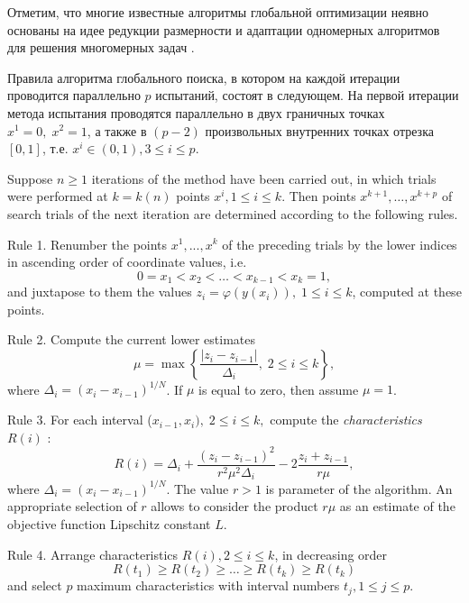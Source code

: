 \documentclass{svproc}
\begin{document}
Отметим, что многие известные алгоритмы глобальной оптимизации неявно основаны на идее редукции размерности и адаптации одномерных алгоритмов для решения многомерных задач \cite{Sergeyev2006,Zilinskas2008,Evtushenko2013}.


Правила алгоритма глобального поиска, в котором на каждой итерации проводится параллельно $p$ испытаний, состоят в следующем.
На первой итерации метода испытания проводятся параллельно в двух граничных точках $x^1 = 0, \; x^2 = 1$, а также в $(p-2)$ произвольных внутренних точках отрезка $[0,1]$, т.е. $x^i\in(0,1),3\leq i \leq p$.

Suppose $n\geq 1$  iterations of the method have been carried out, in which trials were performed at $k=k(n)$ points $x^i,1\leq i \leq k$. Then points $x^{k+1},\dots,x^{k+p}$  of search trials of the next iteration are determined according to the following rules.

Rule 1. Renumber the points $x^1,...,x^k$ of the preceding trials by the
lower indices in ascending order of coordinate values, i.e.
\[
0=x_1<x_2<\dots <x_{k-1} <x_k=1,
\]
and juxtapose to them the values $z_i=\varphi(y(x_i)), \; 1 \leq i \leq k$, computed at these points.

Rule 2. Compute the current lower estimates
\begin{equation}\label{Rule_Mu}
\mu = \max\left\{ \frac{\left|z_i-z_{i-1}\right|}{ \Delta_i },\; 2 \leq i \leq k  \right\},
\end{equation}
where $\Delta_i = (x_i-x_{i-1})^{1/N}$. If $\mu$ is equal to zero, then assume $\mu = 1$.

Rule 3. For each interval ($x_{i-1},x_i), \; 2 \leq i \leq k,$ compute
the \textit{characteristics} $R(i)$ :
\begin{equation}\label{Rule_R}
R(i)=\Delta_i+\frac{(z_i-z_{i-1})^2}{r^2 \mu^2\Delta_i}-2\frac{z_i+z_{i-1}}{r \mu},
\end{equation}
where $\Delta_i=(x_i-x_{i-1})^{1/N}$. The value $r > 1$ is parameter of the algorithm. An appropriate selection
of $r$ allows to consider the product $r \mu$ as an estimate
of the objective function Lipschitz constant $L$.

Rule 4. Arrange characteristics  $R(i), 2 \leq i \leq k$, in decreasing order 
\begin{equation}\label{Rule_Max}
R(t_1)\geq R(t_2)\geq \dots \geq R(t_{k}) \geq R(t_{k})
\end{equation}
and select $p$ maximum characteristics with interval numbers $t_j, 1\leq j \leq p$.
\end{document}
